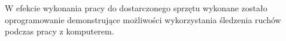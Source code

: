 \label{ch:wstep}

W efekcie wykonania pracy do dostarczonego sprzętu wykonane zostało oprogramowanie demonstrujące możliwości wykorzystania śledzenia ruchów podczas pracy z komputerem.
% 
% 
% 
% 
% 
% 
